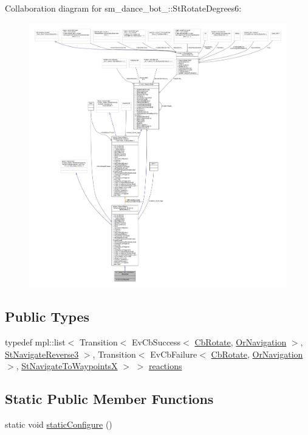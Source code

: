 Collaboration diagram for sm\+\_\+dance\+\_\+bot\+\_\+:\+:St\+Rotate\+Degrees6\+:
\nopagebreak
\begin{figure}[H]
\begin{center}
\leavevmode
\includegraphics[width=350pt]{structsm__dance__bot__2_1_1StRotateDegrees6__coll__graph}
\end{center}
\end{figure}
\subsection*{Public Types}
\begin{DoxyCompactItemize}
\item 
typedef mpl\+::list$<$ Transition$<$ Ev\+Cb\+Success$<$ \hyperlink{classcl__move__base__z_1_1CbRotate}{Cb\+Rotate}, \hyperlink{classsm__dance__bot__2_1_1OrNavigation}{Or\+Navigation} $>$, \hyperlink{structsm__dance__bot__2_1_1StNavigateReverse3}{St\+Navigate\+Reverse3} $>$, Transition$<$ Ev\+Cb\+Failure$<$ \hyperlink{classcl__move__base__z_1_1CbRotate}{Cb\+Rotate}, \hyperlink{classsm__dance__bot__2_1_1OrNavigation}{Or\+Navigation} $>$, \hyperlink{structsm__dance__bot__2_1_1StNavigateToWaypointsX}{St\+Navigate\+To\+WaypointsX} $>$ $>$ \hyperlink{structsm__dance__bot__2_1_1StRotateDegrees6_a3a362ea394fefbe776d10f4709843431}{reactions}
\end{DoxyCompactItemize}
\subsection*{Static Public Member Functions}
\begin{DoxyCompactItemize}
\item 
static void \hyperlink{structsm__dance__bot__2_1_1StRotateDegrees6_a61592eedf7748d25bbb80b8cbd2851be}{static\+Configure} ()
\end{DoxyCompactItemize}
